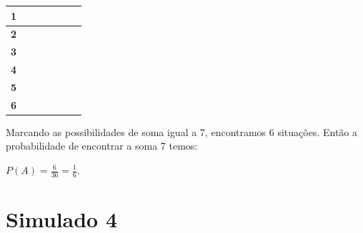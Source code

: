 \begin{escolha}
\begin{boxmedio}
\begin{boxmedio}
{\begin{boxpeq}
\begin{boxpeq}
{\begin{boxpeq}
\begin{boxmedio}
\begin{boxmedio}
\begin{boxpeq}
\begin{boxmedio}
\begin{boxpeq}
\begin{boxpeq}
\begin{boxpeq}
\begin{boxpeq}
\begin{boxmedio}
{\begin{boxmedio}
\begin{boxmedio}
\begin{boxpeq}
\begin{boxmedio}
\begin{boxpeq}
\begin{boxpeq}
\begin{boxpeq}
\begin{escolha}
{\begin{boxmedio}
\begin{boxpeq}
\begin{boxpeq}
\begin{boxpeq}
\begin{boxpeq}
\begin{boxpeq}
\begin{boxmedio}
\begin{boxpeq}
\begin{boxpeq}
\begin{boxpeq}
{\begin{boxpeq}
\begin{boxmedio}
\begin{boxpeq}
\begin{boxpeq}
\begin{boxpeq}
{\begin{boxpeq}
\begin{boxmedio}
{\begin{boxpeq}
\begin{boxpeq}
\begin{boxmedio}
\begin{boxmedio}
\begin{boxpeq}
\begin{boxpeq}
{\begin{boxpeq}
\begin{boxpeq}
\begin{boxpeq}
\begin{boxpeq}
\begin{boxpeq}
\begin{escolha}
\begin{escolha}
{\begin{boxmedio}
\begin{boxpeq}
\begin{q°}
\begin{boxmedio}
\begin{boxpeq}
\begin{boxpeq}
\begin{boxmedio}
\begin{boxmedio}
\begin{boxmedio}
\begin{boxmedio}
{\begin{escolha}
\begin{escolha}
\begin{escolha}
\begin{escolha}
\begin{escolha}
\begin{escolha}
{{\begin{table}[]
\begin{tabular}{|c|c|c|c|c|c|c|}
\textbf{1} &  &  &  &  &  & \cellcolor[HTML]{009901} \\ \hline
\textbf{2} &  &  &  &  & \cellcolor[HTML]{009901} &  \\ \hline
\textbf{3} &  &  &  & \cellcolor[HTML]{009901} &  &  \\ \hline
\textbf{4} &  &  & \cellcolor[HTML]{009901} &  &  &  \\ \hline
\textbf{5} &  & \cellcolor[HTML]{009901} &  &  &  &  \\ \hline
\textbf{6} & \cellcolor[HTML]{009901} &  &  &  &  &  \\ \hline
\end{tabular}
\end{table}

Marcando as possibilidades de soma igual a 7, encontramos 6 situações.
Então a probabilidade de encontrar a soma 7 temos:

$P(A) = \frac{6}{36} = \frac{1}{6}$.}

\chapter{Simulado 4}

}
\end{escolha}
\end{escolha}
\end{escolha}
\end{escolha}
\end{escolha}
\end{escolha}}
\end{boxmedio}
\end{boxmedio}
\end{boxmedio}
\end{boxmedio}
\end{boxpeq}
\end{boxpeq}
\end{boxmedio}
\end{q°}
\end{boxpeq}
\end{boxmedio}}
\end{escolha}
\end{escolha}
\end{boxpeq}
\end{boxpeq}
\end{boxpeq}
\end{boxpeq}
\end{boxpeq}}
\end{boxpeq}
\end{boxpeq}
\end{boxmedio}
\end{boxmedio}
\end{boxpeq}
\end{boxpeq}}
\end{boxmedio}
\end{boxpeq}}
\end{boxpeq}
\end{boxpeq}
\end{boxpeq}
\end{boxmedio}
\end{boxpeq}}
\end{boxpeq}
\end{boxpeq}
\end{boxpeq}
\end{boxmedio}
\end{boxpeq}
\end{boxpeq}
\end{boxpeq}
\end{boxpeq}
\end{boxpeq}
\end{boxmedio}}
\end{escolha}
\end{boxpeq}
\end{boxpeq}
\end{boxpeq}
\end{boxmedio}
\end{boxpeq}
\end{boxmedio}
\end{boxmedio}}
\end{boxmedio}
\end{boxpeq}
\end{boxpeq}
\end{boxpeq}
\end{boxpeq}
\end{boxmedio}
\end{boxpeq}
\end{boxmedio}
\end{boxmedio}
\end{boxpeq}}
\end{boxpeq}
\end{boxpeq}}
\end{boxmedio}
\end{boxmedio}
\end{escolha}
